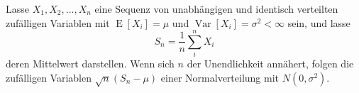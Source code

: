 \documentclass{article}
\begin{document}
Lasse $X_1, X_2, \ldots, X_n$ eine Sequenz von unabhängigen und identisch verteilten zufälligen Variablen mit  $\operatorname{E}[X_i] = \mu$ und 
$\operatorname{Var}[X_i] = \sigma^2 < \infty$ sein, und lasse
\begin{equation*}
S_n = \frac{1}{n}\sum_{i}^{n} X_i
\end{equation*}
deren Mittelwert darstellen. 
Wenn sich $n$ der Unendlichkeit annähert, folgen die zufälligen Variablen 
$\sqrt{n}(S_n - \mu)$ einer Normalverteilung mit $N(0, \sigma^2)$.

\end{document}
